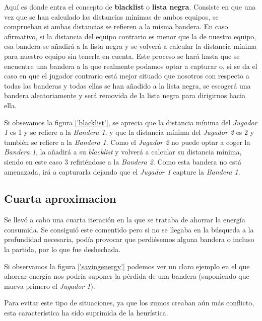 Aquí es donde entra el concepto de \textbf{blacklist} o \textbf{lista
  negra}. Consiste en que una vez que se han calculado las distancias
mínimas de ambos equipos, se comprueban si ambas distancias se
refieren a la misma bandera. En caso afirmativo, si la distancia del
equipo contrario es menor que la de nuestro equipo, esa bandera se
añadirá a la lista negra y se volverá a calcular la distancia mínima
para nuestro equipo sin tenerla en cuenta. Este proceso se
hará hasta que se encuentre una bandera a la que realmente podamos
optar a capturar o, si se da el caso en que el jugador contrario está
mejor situado que nosotros con respecto a todas las banderas y todas
ellas se han añadido a la lista negra, se escogerá una bandera
aleatoriamente y será removida de la lista negra para dirigirnos hacia
ella.

Si obsevamos la figura \ref{'blacklist'}, se aprecia que la distancia
mínima del \emph{Jugador 1} es 1 y se refiere a la \emph{Bandera 1}, y
que la distancia mínima del \emph{Jugador 2} es 2 y también se refiere
a la \emph{Bandera 1}. Como el \emph{Jugador 2} no puede optar a coger
la \emph{Bandera 1}, la añadirá a su \emph{blacklist} y volverá a
calcular su distancia mínima, siendo en este caso 3 refiriéndose a la
\emph{Bandera 2}. Como esta bandera no está amenazada, irá a
capturarla dejando que el \emph{Jugador 1} capture la \emph{Bandera
  1}.


\subsection {Cuarta aproximacion}
\label{sec:energia}
Se llevó a cabo una cuarta iteración en la que se trataba de ahorrar
la energía consumida. Se consiguió este comentido pero si no se
llegaba en la búsqueda a la profundidad necesaria, podía provocar que
perdiésemos alguna bandera o incluso la partida, por lo que fue
deshechada.

Si observamos la figura \ref{'savingenergy'} podemos ver un claro
ejemplo en el que ahorrar energía nos podría suponer la pérdida de una
bandera (suponiendo que mueva primero el \emph{Jugador 1}).


Para evitar este tipo de situaciones, ya que los zumos creaban aún más
conflicto, esta característica ha sido suprimida de la heurística.

